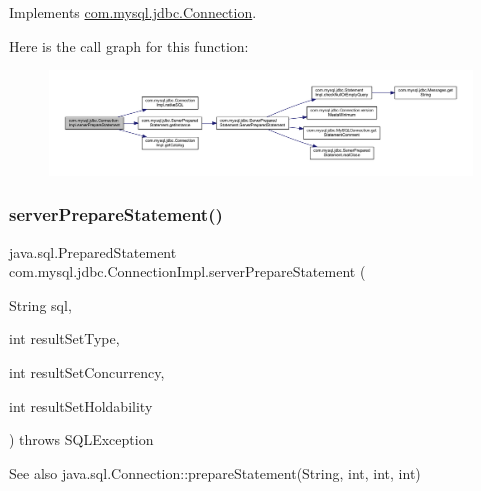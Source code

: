 Implements \mbox{\hyperlink{interfacecom_1_1mysql_1_1jdbc_1_1_connection_acda6552c537e45e1d46a1d8e21beefe3}{com.\+mysql.\+jdbc.\+Connection}}.

Here is the call graph for this function\+:\nopagebreak
\begin{figure}[H]
\begin{center}
\leavevmode
\includegraphics[width=350pt]{classcom_1_1mysql_1_1jdbc_1_1_connection_impl_af4efc83e3fa843f0acaa4bc786d42237_cgraph}
\end{center}
\end{figure}
\mbox{\label{classcom_1_1mysql_1_1jdbc_1_1_connection_impl_afda4b5397a3241273af80d0ba702c6a0}} 
\subsubsection{\texorpdfstring{server\+Prepare\+Statement()}{serverPrepareStatement()}\hspace{0.1cm}{\footnotesize\ttfamily [4/6]}}
{\footnotesize\ttfamily java.\+sql.\+Prepared\+Statement com.\+mysql.\+jdbc.\+Connection\+Impl.\+server\+Prepare\+Statement (\begin{DoxyParamCaption}\item[{String}]{sql,  }\item[{int}]{result\+Set\+Type,  }\item[{int}]{result\+Set\+Concurrency,  }\item[{int}]{result\+Set\+Holdability }\end{DoxyParamCaption}) throws S\+Q\+L\+Exception}

\begin{DoxySeeAlso}{See also}
java.\+sql.\+Connection\+::prepare\+Statement(\+String, int, int, int) 
\end{DoxySeeAlso}


